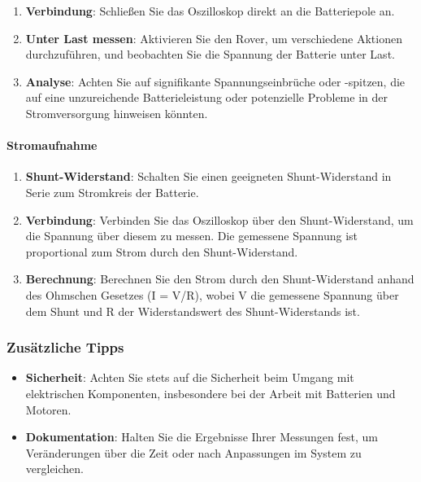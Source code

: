 \documentclass{vorlage-design-main}
\begin{document}
\begin{enumerate}
\def\labelenumi{\arabic{enumi}.}

\item
  \textbf{Verbindung}: Schließen Sie das Oszilloskop direkt an die
  Batteriepole an.
\item
  \textbf{Unter Last messen}: Aktivieren Sie den Rover, um verschiedene
  Aktionen durchzuführen, und beobachten Sie die Spannung der Batterie
  unter Last.
\item
  \textbf{Analyse}: Achten Sie auf signifikante Spannungseinbrüche oder
  -spitzen, die auf eine unzureichende Batterieleistung oder potenzielle
  Probleme in der Stromversorgung hinweisen könnten.
\end{enumerate}

\hypertarget{stromaufnahme}{%
\paragraph{Stromaufnahme}\label{stromaufnahme}}

\begin{enumerate}
\def\labelenumi{\arabic{enumi}.}

\item
  \textbf{Shunt-Widerstand}: Schalten Sie einen geeigneten
  Shunt-Widerstand in Serie zum Stromkreis der Batterie.
\item
  \textbf{Verbindung}: Verbinden Sie das Oszilloskop über den
  Shunt-Widerstand, um die Spannung über diesem zu messen. Die gemessene
  Spannung ist proportional zum Strom durch den Shunt-Widerstand.
\item
  \textbf{Berechnung}: Berechnen Sie den Strom durch den
  Shunt-Widerstand anhand des Ohmschen Gesetzes (I = V/R), wobei V die
  gemessene Spannung über dem Shunt und R der Widerstandswert des
  Shunt-Widerstands ist.
\end{enumerate}

\hypertarget{zusuxe4tzliche-tipps}{%
\subsubsection{Zusätzliche Tipps}\label{zusaetzliche-tipps}}

\begin{itemize}

\item
  \textbf{Sicherheit}: Achten Sie stets auf die Sicherheit beim Umgang
  mit elektrischen Komponenten, insbesondere bei der Arbeit mit
  Batterien und Motoren.
\item
  \textbf{Dokumentation}: Halten Sie die Ergebnisse Ihrer Messungen
  fest, um Veränderungen über die Zeit oder nach Anpassungen im System
  zu vergleichen.
\end{itemize}
\end{document}
